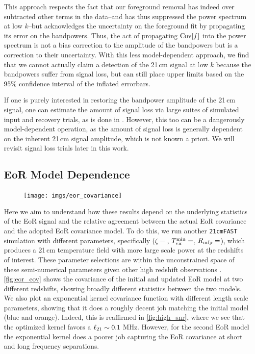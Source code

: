 \documentclass[a4paper,fleqn,usenatbib]{mnras}
\def\Cov{{\rm Cov}}
\def\ellto{\ell_{\rm 21}}
\begin{document}
This approach respects the fact that our foreground removal has indeed over subtracted other terms in the data--and has thus suppressed the power spectrum at low $k$--but acknowledges the uncertainty on the foreground fit by propagating its error on the bandpowers.
Thus, the act of propagating $\Cov[f]$ into the power spectrum is not a bias correction to the amplitude of the bandpowers but is a correction to their uncertainty.
With this less model-dependent approach, we find that we cannot actually claim a detection of the 21\,cm signal at low $k$ because the bandpowers suffer from signal loss, but can still place upper limits based on the 95\% confidence interval of the inflated errorbars.

If one is purely interested in restoring the bandpower amplitude of the 21\,cm signal, one can estimate the amount of signal loss via large suites of simulated input and recovery trials, as is done in .
However, this too can be a dangerously model-dependent operation, as the amount of signal loss is generally dependent on the inherent 21\,cm signal amplitude, which is not known a priori.
We will revisit signal loss trials later in this work.


\subsection{EoR Model Dependence}


\begin{figure}
\centering
\texttt{[image: imgs/eor\_covariance]}
\caption{}
\label{fig:eor_cov}
\end{figure}

Here we aim to understand how these results depend on the underlying statistics of the EoR signal and the relative agreement between the actual EoR covariance and the adopted EoR covariance model.
To do this, we run another \texttt{21cmFAST} simulation with different parameters, specifically ($\zeta=$, $T_{\rm vir}^{\rm min}=$, $R_{\rm mfp}=$), which produces a 21\,cm temperature field with more large scale power at the redshifts of interest.
These parameter selections are within the unconstrained space of these semi-numerical parameters given other high redshift observations \citep{Greig2017}.
\autoref{fig:eor_cov} shows the covariance of the initial and updated EoR model at two different redshifts, showing broadly different statistics between the two models.
We also plot an exponential kernel covariance function with different length scale parameters, showing that it does a roughly decent job matching the initial model (blue and orange).
Indeed, this is reaffirmed in \autoref{fig:high_snr}, where we see that the optimized kernel favors a $\ellto\sim0.1$ MHz.
However, for the second EoR model the exponential kernel does a poorer job capturing the EoR covariance at short and long frequency separations.
\end{document}
